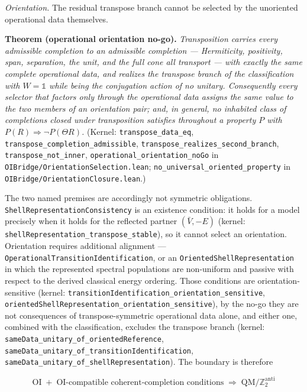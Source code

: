 \documentclass[
]{article}
\begin{document}
\emph{Orientation.} The residual transpose branch cannot be selected by
the unoriented operational data themselves.

\textbf{Theorem (operational orientation no-go).} \emph{Transposition
carries every admissible completion to an admissible completion ---
Hermiticity, positivity, span, separation, the unit, and the full cone
all transport --- with exactly the same complete operational data, and
realizes the transpose branch of the classification with
\(W = \mathbb{1}\) while being the conjugation action of no unitary.
Consequently every selector that factors only through the operational
data assigns the same value to the two members of an orientation pair;
and, in general, no inhabited class of completions closed under
transposition satisfies throughout a property \(P\) with
\(P(R) \Rightarrow \neg P(\Theta R)\).} (Kernel:
\texttt{transpose\_data\_eq},
\texttt{transpose\_completion\_admissible},
\texttt{transpose\_realizes\_second\_branch},
\texttt{transpose\_not\_inner}, \texttt{operational\_orientation\_noGo}
in \texttt{OIBridge/OrientationSelection.lean};
\texttt{no\_universal\_oriented\_property} in
\texttt{OIBridge/OrientationClosure.lean}.)

The two named premises are accordingly not symmetric obligations.
\texttt{ShellRepresentationConsistency} is an existence condition: it
holds for a model precisely when it holds for the reflected partner
\((\bar V, -E)\) (kernel:
\texttt{shellRepresentation\_transpose\_stable}), so it cannot select an
orientation. Orientation requires additional alignment ---
\texttt{OperationalTransitionIdentification}, or an
\texttt{OrientedShellRepresentation} in which the represented spectral
populations are non-uniform and passive with respect to the derived
classical energy ordering. Those conditions are orientation-sensitive
(kernel: \texttt{transitionIdentification\_orientation\_sensitive},\\
\texttt{orientedShellRepresentation\_orientation\_sensitive}), by the
no-go they are not consequences of transpose-symmetric operational data
alone, and either one, combined with the classification, excludes the
transpose branch (kernel:
\texttt{sameData\_unitary\_of\_orientedReference},
\texttt{sameData\_unitary\_of\_transitionIdentification},
\texttt{sameData\_unitary\_of\_shellRepresentation}). The boundary is
therefore

\[\boxed{\;\mathrm{OI} \;+\; \text{OI-compatible coherent-completion conditions} \;\Longrightarrow\; \mathrm{QM}/\mathbb{Z}_2^{\mathrm{anti}}\;}\]
\end{document}

